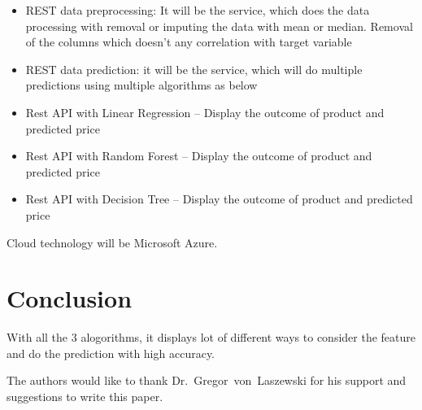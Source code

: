 \begin{itemize}
\item REST data preprocessing: It will be the service, which does the data processing 
with removal or imputing the data with mean or median. Removal of the columns which 
doesn’t any correlation with target variable
\item REST data prediction: it will be the service, which will do multiple predictions 
using multiple algorithms as below

\item Rest API with Linear Regression – Display the outcome of product and predicted 
price
\item Rest API with Random Forest – Display the outcome of product and predicted price
\item Rest API with Decision Tree – Display the outcome of product and predicted price
\end{itemize}

Cloud technology will be Microsoft Azure.

\section{Conclusion}

With all the 3 alogorithms, it displays lot of different ways to consider the feature
and do the prediction with high accuracy.


\begin{acks}

  The authors would like to thank Dr.~Gregor~von~Laszewski for his
  support and suggestions to write this paper.

\end{acks}


 

